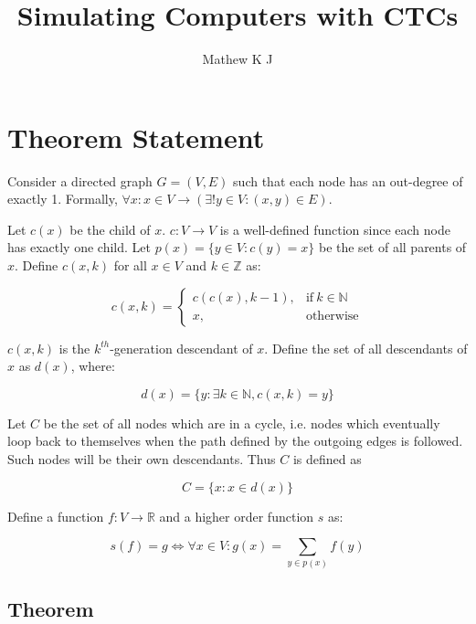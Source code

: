 \documentclass[11pt]{article}
\title{Simulating Computers with CTCs}
\author{Mathew K J}
\begin{document}
    \section{Theorem Statement}

    Consider a directed graph $G = (V,E)$ such that each node has an out-degree of exactly 1. Formally, $\forall x: x \in V \rightarrow (\exists! y \in V: (x,y) \in E)$.

    Let $c(x)$ be the child of $x$. $c: V \rightarrow V$ is a well-defined function since each node has exactly one child. Let $p(x)=\{y\in V:c(y)=x\}$ be the set of all parents of $x$. Define $c(x, k)$ for all $x \in V$ and $k \in \mathbb{Z}$ as:

    \begin{equation}
        c(x,k)=
        \begin{cases}
            c(c(x),k-1), & \text{if}\ k \in \mathbb{N} \\
            x, & \text{otherwise}
        \end{cases}
        \label{define_cxk}
    \end{equation}

    $c(x,k)$ is the $k^{th}$-generation descendant of $x$. Define the set of all descendants of $x$ as $d(x)$, where:

    \begin{equation}
        d(x) = \{y : \exists k\in \mathbb{N}, c(x,k) = y\}
        \label{define_d}
    \end{equation}

    Let $C$ be the set of all nodes which are in a cycle, i.e. nodes which eventually loop back to themselves when the path defined by the outgoing edges is followed. Such nodes will be their own descendants. Thus $C$ is defined as

    \begin{equation}
        C = \{x : x\in d(x)\}
        \label{define_C}
    \end{equation}


    Define a function $f: V\rightarrow\mathbb{R}$ and a higher order function $s$ as:

    \begin{equation}
        s(f)=g \Leftrightarrow \forall x \in V: g(x) = \sum_{y \in p(x)} f(y)
        \label{define_s}
    \end{equation}




    \subsection{Theorem}
\end{document}
